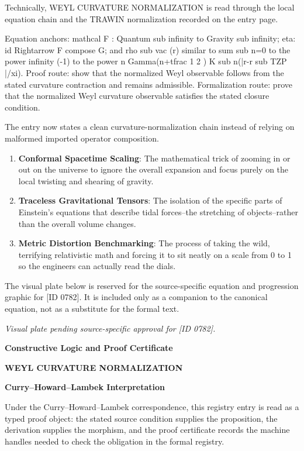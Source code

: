 Technically, WEYL CURVATURE NORMALIZATION is read through the local equation chain and the TRAWIN normalization recorded on the entry page.

Equation anchors: mathcal F : Quantum sub infinity to Gravity sub infinity; eta: id Rightarrow F compose G; and rho sub vac (r) similar to sum sub n=0 to the power infinity (-1) to the power n Gamma(n+tfrac 1 2 ) K sub n(|r-r sub TZP |/xi). Proof route: show that the normalized Weyl observable follows from the stated curvature contraction and remains admissible. Formalization route: prove that the normalized Weyl curvature observable satisfies the stated closure condition.

The entry now states a clean curvature-normalization chain instead of relying on malformed imported operator composition.
\endgroup

\begin{enumerate}[leftmargin=1.6em,itemsep=6pt,topsep=4pt]
\item \textbf{Conformal Spacetime Scaling}: The mathematical trick of zooming in or out on the universe to ignore the overall expansion and focus purely on the local twisting and shearing of gravity.
\item \textbf{Traceless Gravitational Tensors}: The isolation of the specific parts of Einstein's equations that describe tidal forces--the stretching of objects--rather than the overall volume changes.
\item \textbf{Metric Distortion Benchmarking}: The process of taking the wild, terrifying relativistic math and forcing it to sit neatly on a scale from 0 to 1 so the engineers can actually read the dials.
\end{enumerate}

\begingroup\footnotesize\sloppy
The visual plate below is reserved for the source-specific equation and progression graphic for [ID 0782]. It is included only as a companion to the canonical equation, not as a substitute for the formal text.
\par\endgroup
\begingroup\footnotesize\itshape
Visual plate pending source-specific approval for [ID 0782].
\par\endgroup

\clearpage
\begingroup\tzpsupportsetup
\noindent\textbf{\fontsize{10.8pt}{12.8pt}\selectfont [ID 0782] Constructive Logic and Proof Certificate}\par
\noindent\textbf{\fontsize{10pt}{12pt}\selectfont WEYL CURVATURE NORMALIZATION}\par
\vspace{0.45em}
\begingroup
\footnotesize
\setlength{\parskip}{0.22em}
\setlength{\parindent}{0pt}
\noindent\textbf{Curry--Howard--Lambek Interpretation}\par
Under the Curry--Howard--Lambek correspondence, this registry entry is read as a typed proof
object: the stated source condition supplies the proposition, the derivation supplies the
morphism, and the proof certificate records the machine handles needed to check the obligation
in the formal registry.

